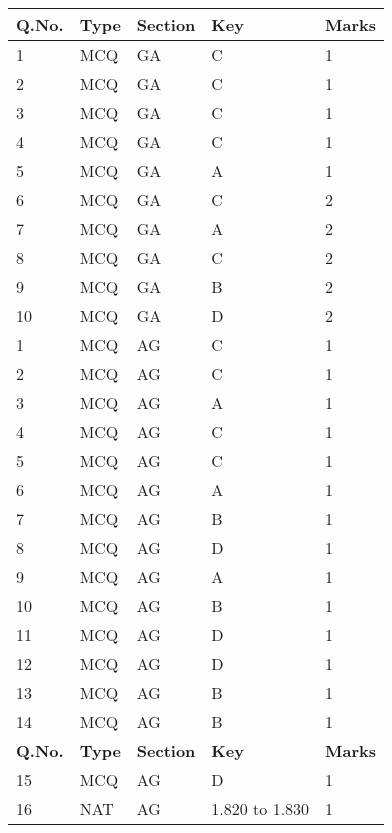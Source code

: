 \documentclass[12pt]{article}
\begin{document}
	\newpage
	\pagestyle{empty}
	\renewcommand{\arraystretch}{1.5}
	\begin{center}
		\begin{longtable}{|p{2.5cm}|p{2.5cm}|p{2.5cm}|p{6cm}|p{2.5cm}|}
			\hline
			\rowcolor{gray!30}
			\textbf{Q.No.} & \textbf{Type} & \textbf{Section} & \textbf{Key} & \textbf{Marks} \\
			\hline
			\endfirsthead
			\endhead
			1 & MCQ & GA & C & 1 \\
			\hline
			2 & MCQ & GA & C & 1 \\
			\hline
			3 & MCQ & GA & C & 1 \\
			\hline
			4 & MCQ & GA & C & 1 \\
			\hline
			5 & MCQ & GA & A & 1 \\
			\hline
			6 & MCQ & GA & C & 2 \\
			\hline
			7 & MCQ & GA & A & 2 \\
			\hline
			8 & MCQ & GA & C & 2 \\
			\hline
			9 & MCQ & GA & B & 2 \\
			\hline
			10 & MCQ & GA & D & 2 \\
			\hline
			1 & MCQ & AG & C & 1 \\
			\hline
			2 & MCQ & AG & C & 1 \\
			\hline
			3 & MCQ & AG & A & 1 \\
			\hline
			4 & MCQ & AG & C & 1 \\
			\hline
			5 & MCQ & AG & C & 1 \\
			\hline
			6 & MCQ & AG & A & 1 \\
			\hline
			7 & MCQ & AG & B & 1 \\
			\hline
			8 & MCQ & AG & D & 1 \\
			\hline
			9 & MCQ & AG & A & 1 \\
			\hline
			10 & MCQ & AG & B & 1 \\
			\hline
			11 & MCQ & AG & D & 1 \\
			\hline
			12 & MCQ & AG & D & 1 \\
			\hline
			13 & MCQ & AG & B & 1 \\
			\hline
			14 & MCQ & AG & B & 1 \\
			\hline
			\newpage
			\hline
			\rowcolor{gray!30}
			\textbf{Q.No.} & \textbf{Type} & \textbf{Section} & \textbf{Key} & \textbf{Marks} \\
			\hline
			15 & MCQ & AG & D & 1 \\
			\hline
			16 & NAT & AG & 1.820 to 1.830 & 1 \\

\end{longtable}
\end{center}
\end{document}
